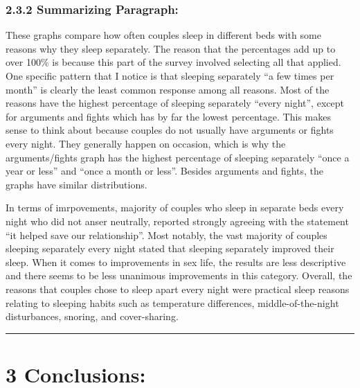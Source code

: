 \documentclass[
]{article}
\begin{document}
\hypertarget{summarizing-paragraph-3}{%
\subsubsection{2.3.2 Summarizing
Paragraph:}\label{summarizing-paragraph-3}}

These graphs compare how often couples sleep in different beds with some
reasons why they sleep separately. The reason that the percentages add
up to over 100\% is because this part of the survey involved selecting
all that applied. One specific pattern that I notice is that sleeping
separately ``a few times per month'' is clearly the least common
response among all reasons. Most of the reasons have the highest
percentage of sleeping separately ``every night'', except for arguments
and fights which has by far the lowest percentage. This makes sense to
think about because couples do not usually have arguments or fights
every night. They generally happen on occasion, which is why the
arguments/fights graph has the highest percentage of sleeping separately
``once a year or less'' and ``once a month or less''. Besides arguments
and fights, the graphs have similar distributions.

In terms of imrpovements, majority of couples who sleep in separate beds
every night who did not anser neutrally, reported strongly agreeing with
the statement ``it helped save our relationship''. Most notably, the
vast majority of couples sleeping separately every night stated that
sleeping separately improved their sleep. When it comes to improvements
in sex life, the results are less descriptive and there seems to be less
unanimous improvements in this category. Overall, the reasons that
couples chose to sleep apart every night were practical sleep reasons
relating to sleeping habits such as temperature differences,
middle-of-the-night disturbances, snoring, and cover-sharing.

\begin{center}\rule{0.5\linewidth}{0.5pt}\end{center}

\hypertarget{conclusions}{%
\section{3 Conclusions:}\label{conclusions}}
\end{document}

